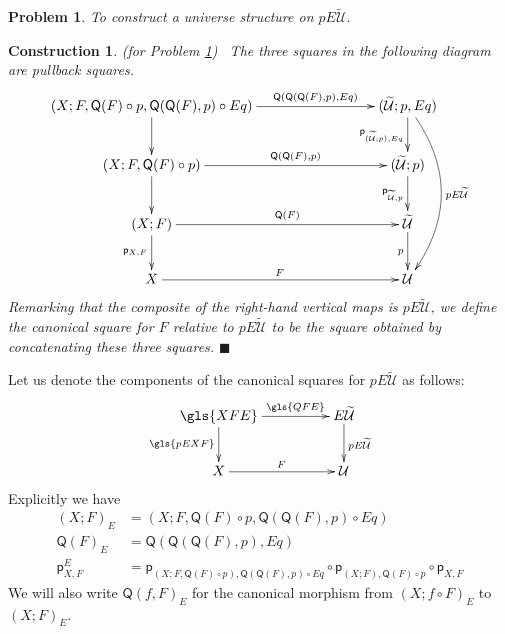 \documentclass[12pt]{article}
\numberwithin{equation}{section}
\newenvironment{eq}{\begin{equation}}{\end{equation}}
\newtheorem{problem}[proposition]{Problem}
\newtheorem{construction0}[proposition]{Construction}
\newenvironment{construction}[1]{\begin{construction0}(for Problem \ref{#1})\ }{$\blacksquare$ \end{construction0}}
\newcommand{\wt}{\widetilde}
\newcommand{\p}{\mathsf{p}}
\newcommand{\U}{\mathcal{U}}
\newcommand{\Q}{\mathsf{Q}}
\begin{document}
\begin{problem}
\label{2015.05.08.prob1} To construct a universe structure on $pE\wt{\U}$.
\end{problem}
%
\begin{construction}{2015.05.08.prob1}\rm
\label{2015.05.08.constr1} The three squares in the following diagram are pullback squares.
\begin{eq}\label{pEU-diagram}
  \begin{xy}
    \xymatrix@C=7pc{
      (X;F,\Q(F)\circ p, \Q(\Q(F),p)\circ Eq) \ar[r]^-{\Q(\Q(\Q(F),p),Eq)} \ar[d] & (\wt{\U}; p, Eq) \ar[d]_{\p_{(\wt{\U};p),Eq}} \ar@/^2pc/[ddd]^{pE\wt{\U}} \\
      (X;F,\Q(F)\circ p) \ar[r]^-{\Q(\Q(F),p)} \ar[d]                             & (\wt{\U};p) \ar[d]_{\p_{\wt{\U},p}} \\
      (X;F) \ar[r]^-{\Q(F)} \ar[d]_{\p_{X,F}}                                       & \wt{\U} \ar[d]_{p} \\
      X \ar[r]^{F}                                                                & \U
    }
  \end{xy}
\end{eq}%
Remarking that the composite of the right-hand vertical maps is $pE\wt{\U}$, we
define the canonical square for $F$ relative to $pE\wt{\U}$ to be the
square obtained by concatenating these three squares.
\end{construction}
%
Let us denote the components of the canonical squares for $pE\wt{\U}$ as
follows:
%
$$
\begin{xy}
          \xymatrix@C=4pc{ \gls{XFE} \ar[r]^-{\gls{QFE}} \ar[d]_{\gls{pEXF}} &
            E\wt{\U} \ar[d]^{pE\wt{\U}}\\ X \ar[r]^{F} & \U }
\end{xy}
$$
%
Explicitly we have
%
\begin{align*}
  (X;F)_{E}&=(X;F,\Q(F)\circ p, \Q(\Q(F),p)\circ Eq) \\
  \Q(F)_{E}&=\Q(\Q(\Q(F),p),Eq) \\
  \p_{X,F}^E&=\p_{(X;F,\Q(F)\circ p),\Q(\Q(F),p)\circ Eq}\circ \p_{(X;F),\Q(F)\circ p}\circ \p_{X,F}
\end{align*}
%
We will also write $\Q(f,F)_{E}$ for the canonical morphism from $(X;f\circ
F)_{E}$ to $(X;F)_{E}$.
%
\end{document}
